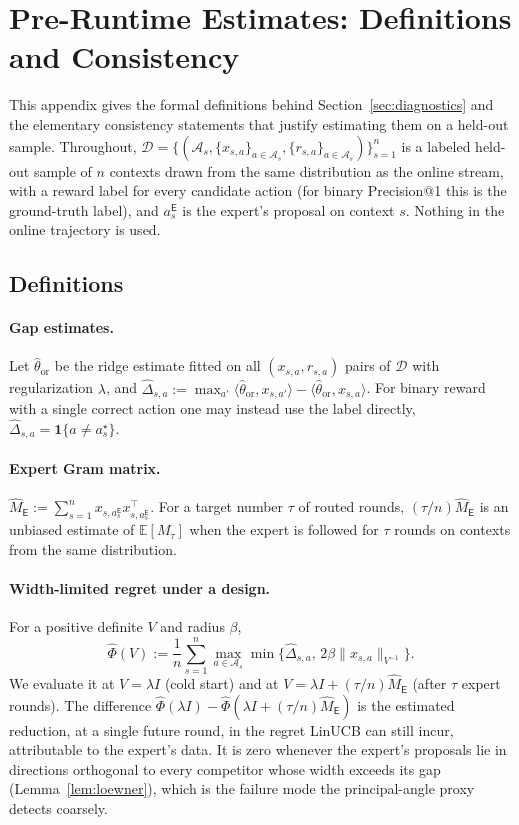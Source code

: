 \documentclass{article}
\theoremstyle{definition}
\theoremstyle{remark}
\newcommand{\E}{\mathbb{E}}
\newcommand{\ind}{\mathbf{1}}
\theoremstyle{remark}
\newcommand{\Exp}{\mathsf{E}}
\begin{document}
\section{Pre-Runtime Estimates: Definitions and Consistency}
\label{app:diagnostics}

This appendix gives the formal definitions behind Section~\ref{sec:diagnostics}
and the elementary consistency statements that justify estimating them on a
held-out sample. Throughout, $\mathcal D=\{(\mathcal A_s,\{x_{s,a}\}_{a\in\mathcal A_s},\{r_{s,a}\}_{a\in\mathcal A_s})\}_{s=1}^{n}$
is a labeled held-out sample of $n$ contexts drawn from the same distribution
as the online stream, with a reward label for every candidate action (for
binary Precision@1 this is the ground-truth label), and $a_s^{\Exp}$ is the
expert's proposal on context $s$. Nothing in the online trajectory is used.

\subsection{Definitions}
\label{app:diag-defs}

\paragraph{Gap estimates.} Let $\widehat\theta_{\mathrm{or}}$ be the ridge
estimate fitted on all $(x_{s,a},r_{s,a})$ pairs of $\mathcal D$ with
regularization $\lambda$, and
$\widehat\Delta_{s,a}:=\max_{a'}\langle\widehat\theta_{\mathrm{or}},x_{s,a'}\rangle-\langle\widehat\theta_{\mathrm{or}},x_{s,a}\rangle$.
For binary reward with a single correct action one may instead use the label
directly, $\widehat\Delta_{s,a}=\ind\{a\ne a_s^\star\}$.

\paragraph{Expert Gram matrix.}
$\widehat M_{\Exp}:=\sum_{s=1}^nx_{s,a_s^{\Exp}}x_{s,a_s^{\Exp}}^\top$. For a target
number $\tau$ of routed rounds, $(\tau/n)\widehat M_{\Exp}$ is an unbiased
estimate of $\E[M_\tau]$ when the expert is followed for $\tau$ rounds on
contexts from the same distribution.

\paragraph{Width-limited regret under a design.} For a positive definite
$V$ and radius $\beta$,
\[
\widehat\Phi(V):=\frac1n\sum_{s=1}^n\max_{a\in\mathcal A_s}\min\bigl\{\widehat\Delta_{s,a},\,2\beta\|x_{s,a}\|_{V^{-1}}\bigr\}.
\]
We evaluate it at $V=\lambda I$ (cold start) and at
$V=\lambda I+(\tau/n)\widehat M_{\Exp}$ (after $\tau$ expert rounds). The
difference $\widehat\Phi(\lambda I)-\widehat\Phi(\lambda I+(\tau/n)\widehat M_{\Exp})$
is the estimated reduction, at a single future round, in the regret LinUCB
can still incur, attributable to the expert's data. It is zero whenever the
expert's proposals lie in directions orthogonal to every competitor whose
width exceeds its gap (Lemma~\ref{lem:loewner}), which is the failure mode the
principal-angle proxy detects coarsely.
\end{document}
